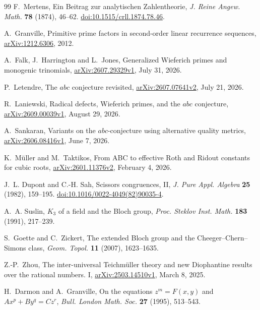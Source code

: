 \documentclass[11pt]{amsart}
\theoremstyle{definition}
\theoremstyle{remark}
\begin{document}
\begin{thebibliography}{99}
F.~Mertens,
Ein Beitrag zur analytischen Zahlentheorie,
\emph{J. Reine Angew. Math.} \textbf{78} (1874), 46--62.
\href{https://doi.org/10.1515/crll.1874.78.46}%
{doi:10.1515/crll.1874.78.46}.

A.~Granville,
Primitive prime factors in second-order linear recurrence sequences,
\href{https://arxiv.org/abs/1212.6306}{arXiv:1212.6306}, 2012.

A.~Falk, J.~Harrington and L.~Jones,
Generalized Wieferich primes and monogenic trinomials,
\href{https://arxiv.org/abs/2607.29329v1}{arXiv:2607.29329v1},
July 31, 2026.

P.~Letendre,
The $abc$ conjecture revisited,
\href{https://arxiv.org/abs/2607.07641v2}{arXiv:2607.07641v2},
July 21, 2026.

R.~Laniewski,
Radical defects, Wieferich primes, and the $abc$ conjecture,
\href{https://arxiv.org/abs/2609.00039v1}{arXiv:2609.00039v1},
August 29, 2026.

A.~Sankaran,
Variants on the $abc$-conjecture using alternative quality metrics,
\href{https://arxiv.org/abs/2606.08416v1}{arXiv:2606.08416v1},
June 7, 2026.

K.~M\"uller and M.~Taktikos,
From ABC to effective Roth and Ridout constants for cubic roots,
\href{https://arxiv.org/abs/2601.11376v2}{arXiv:2601.11376v2},
February 4, 2026.

J.~L. Dupont and C.-H. Sah,
Scissors congruences, II,
\emph{J. Pure Appl. Algebra} \textbf{25} (1982), 159--195.
\href{https://doi.org/10.1016/0022-4049(82)90035-4}%
{doi:10.1016/0022-4049(82)90035-4}.

A.~A. Suslin,
$K_3$ of a field and the Bloch group,
\emph{Proc. Steklov Inst. Math.} \textbf{183} (1991), 217--239.

S.~Goette and C.~Zickert,
The extended Bloch group and the Cheeger--Chern--Simons class,
\emph{Geom. Topol.} \textbf{11} (2007), 1623--1635.

Z.-P.~Zhou,
The inter-universal Teichm\"uller theory and new Diophantine results over the
rational numbers. I,
\href{https://arxiv.org/abs/2503.14510v1}{arXiv:2503.14510v1},
March 8, 2025.

H.~Darmon and A.~Granville,
On the equations $z^m=F(x,y)$ and $Ax^p+By^q=Cz^r$,
\emph{Bull. London Math. Soc.} \textbf{27} (1995), 513--543.


\end{thebibliography}
\end{document}
